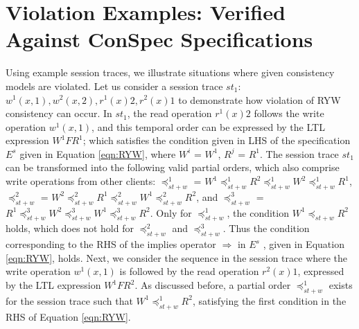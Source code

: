\documentclass[journal,compsoc]{IEEEtran}
\begin{document}
\section{Violation Examples: Verified \\ Against ConSpec Specifications}\label{sec:examples}
  Using example session traces, we illustrate situations where given consistency models are violated. Let us consider a
session trace $\mathit{st}_1$: $w^1(x,1), w^2(x,2), r^1(x){2}, r^2(x){1}$ to demonstrate how violation of RYW consistency can occur. 
 In $\mathit{st}_1$, the read operation $r^1(x){2}$
 follows the write operation $w^1(x,1)$, and this temporal order can be expressed by the LTL expression $W^1 F R^1$; which satisfies the
 condition given in LHS of the specification $E^{s}$ given in Equation \ref{eqn:RYW}, where $W^i$ = $W^1$, $R^j$ = $R^1$. The session trace
 $\mathit{st}_1$ can be transformed into the following valid partial orders, which also comprise write operations from other
 clients: $\preccurlyeq_{\mathit{st}+w}^1$ = $W^1 \preccurlyeq_{\mathit{st}+w}^1 R^2 \preccurlyeq_{\mathit{st}+w}^1 W^2 \preccurlyeq_{\mathit{st}+w}^1 R^1$, $\preccurlyeq_{\mathit{st}+w}^2$ = $W^2 \preccurlyeq_{\mathit{st}+w}^2 R^1 \preccurlyeq_{\mathit{st}+w}^2 W^1 \preccurlyeq_{\mathit{st}+w}^2 R^2$,
  and $\preccurlyeq_{\mathit{st}+w}^3$ = $R^1 \preccurlyeq_{\mathit{st}+w}^3 W^2 \preccurlyeq_{\mathit{st}+w}^3 W^1 \preccurlyeq_{\mathit{st}+w}^3 R^2$.
 Only for $\preccurlyeq_{\mathit{st}+w}^1$, the condition $W^1 \preccurlyeq_{\mathit{st}+w} R^2$ holds, which does not hold for $\preccurlyeq_{\mathit{st}+w}^2$ and $\preccurlyeq_{\mathit{st}+w}^3$.
 Thus the condition corresponding to the RHS of the implies operator $\Rightarrow$ in $E^{s}$ , given in Equation \ref{eqn:RYW}, holds.
  Next, we consider the sequence in the session trace where the
   write operation $w^1(x,1)$ is followed by the read operation  $r^2(x){1}$, expressed by the LTL expression $W^1 F R^2$. As discussed before, a partial
  order $\preccurlyeq_{\mathit{st}+w}^1$ exists for the session trace such that $W^1 \preccurlyeq_{\mathit{st}+w}^1 R^2$, satisfying the first
  condition in the RHS of Equation \ref{eqn:RYW}.
\end{document}
